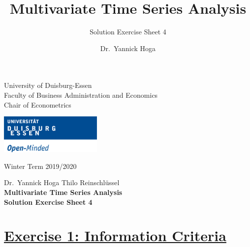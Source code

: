 \documentclass[12pt,a4paper]{article}
\title{Multivariate Time Series Analysis}
\subtitle{Solution Exercise Sheet 4}
\author{Dr.~Yannick Hoga}
\date{}
\newcommand{\tmpsection}[1]{}
\let\tmpsection=\section
\renewcommand{\section}[1]{\tmpsection{\underline{#1}} }
\begin{document}





\restoregeometry



\begin{minipage}{0.6\textwidth}
University of Duisburg-Essen\\
Faculty of Business Administration and Economics\\
Chair of Econometrics\\
\end{minipage}

	\begin{flushright}
	\vspace{-3cm}
	\includegraphics*[width=5cm]{../Includes/duelogo_en.png}\\
	\vspace{.125cm}
	\end{flushright}
\hspace{-0.005cm}Winter Term 2019/2020

\vspace{0.05cm}

\begin{center}
	\vspace{.25cm}
	Dr.~Yannick Hoga \hspace{.5cm} Thilo Reinschlüssel \\
	\vspace{.25cm}
	\textbf{\Large{Multivariate Time Series Analysis}}\\
	\vspace{.25cm}
	\textbf{\large{Solution Exercise Sheet 4}}\\
	\vspace{.125cm}
\end{center}





\hypertarget{exercise-1-information-criteria}{%
\section{Exercise 1: Information
Criteria}\label{exercise-1-information-criteria}}
\end{document}
